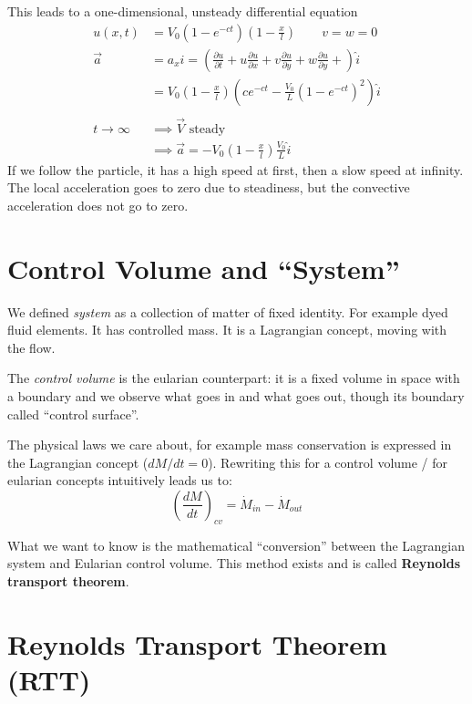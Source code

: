 This leads to a one-dimensional, unsteady differential equation
\begin{equation*}
	\begin{split}
		u(x,t) &= V_0(1-e^{-ct})\left(1-\frac xl\right)\qquad v=w=0\\
		\vec a & = a_x \hat i  = \left(
		\frac{\partial u}{\partial t} + 
		u\frac{\partial u}{\partial x} + 
		v\frac{\partial u}{\partial y} + 
		w\frac{\partial u}{\partial y} + 
		\right)\hat i\\ &= V_0\left(1-\frac xl\right) \left(ce^{-ct}-\frac {V_0}L\left(1-e^{-ct}\right)^2\right)\hat i\\\\
		t\to \infty &\implies\vec V \text{ steady}\\
		& \implies \vec a  =-V_0\left(1-\frac xl\right)\frac {V_0}L\hat i
	\end{split}
\end{equation*}
If we follow the particle, it has a high speed at first, then a slow speed at infinity. The local acceleration goes to zero due to steadiness, but the convective acceleration does not go to zero.

\section{Control Volume and \enquote{System}}
We defined \textit{system} as a collection of matter of fixed identity. For example dyed fluid elements. It has controlled mass. It is a Lagrangian concept, moving with the flow.

The \textit{control volume} is the eularian counterpart: it is a fixed volume in space with a boundary and we observe what goes in and what goes out, though its boundary called \enquote{control surface}.

The physical laws we care about, for example mass conservation is expressed in the Lagrangian concept ($dM/dt = 0$). Rewriting this for a control volume / for eularian concepts intuitively leads us to:
\begin{equation*}
	\left(\frac{dM}{dt}\right)_{cv} = \dot M_{in} - \dot M_{out}
\end{equation*}

What we want to know is the mathematical \enquote{conversion} between the Lagrangian system and Eularian control volume. This method exists and is called \textbf{Reynolds transport theorem}.

\section{Reynolds Transport Theorem (RTT)}

